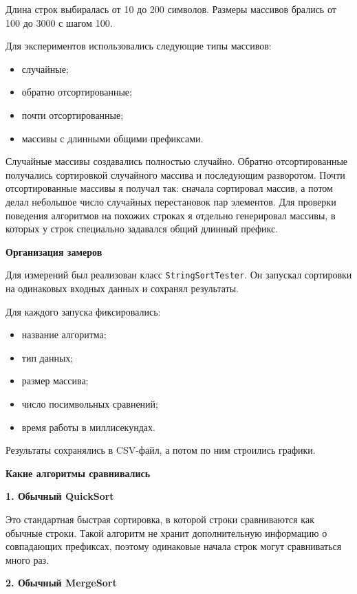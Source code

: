 \documentclass[12pt,a4paper]{article}
\begin{document}
Длина строк выбиралась от 10 до 200 символов.  
Размеры массивов брались от 100 до 3000 с шагом 100.

Для экспериментов использовались следующие типы массивов:
\begin{itemize}
    \item случайные;
    \item обратно отсортированные;
    \item почти отсортированные;
    \item массивы с длинными общими префиксами.
\end{itemize}

Случайные массивы создавались полностью случайно.  
Обратно отсортированные получались сортировкой случайного массива и последующим разворотом.  
Почти отсортированные массивы я получал так: сначала сортировал массив, а потом делал небольшое число случайных перестановок пар элементов.  
Для проверки поведения алгоритмов на похожих строках я отдельно генерировал массивы, в которых у строк специально задавался общий длинный префикс.

\bigskip

\textbf{Организация замеров}

Для измерений был реализован класс \texttt{StringSortTester}.  
Он запускал сортировки на одинаковых входных данных и сохранял результаты.

Для каждого запуска фиксировались:
\begin{itemize}
    \item название алгоритма;
    \item тип данных;
    \item размер массива;
    \item число посимвольных сравнений;
    \item время работы в миллисекундах.
\end{itemize}

Результаты сохранялись в CSV-файл, а потом по ним строились графики.

\bigskip

\textbf{Какие алгоритмы сравнивались}

\textbf{1. Обычный QuickSort}

Это стандартная быстрая сортировка, в которой строки сравниваются как обычные строки.  
Такой алгоритм не хранит дополнительную информацию о совпадающих префиксах, поэтому одинаковые начала строк могут сравниваться много раз.

\medskip

\textbf{2. Обычный MergeSort}
\end{document}
